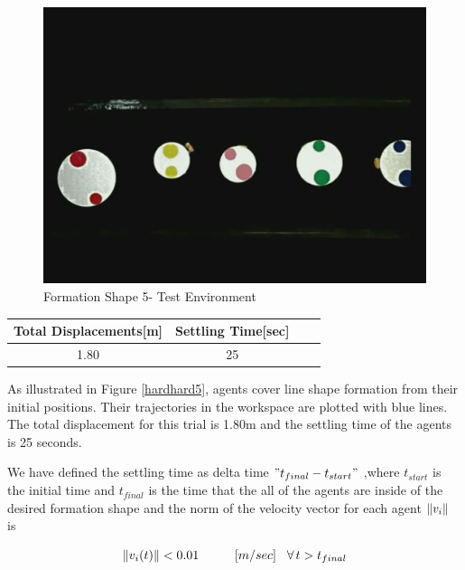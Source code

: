 \begin{figure}[H]
\caption{Formation Shape 5- Test Environment}
\centerline{\includegraphics[scale = 0.35]{9_real_hardware}}
\end{figure} 
					
\begin{center}
 \label{hardwareshape5_ref} 
\begin{tabular}{||c| c |c |c ||}
\hline
Total Displacements[m]  & Settling Time[sec]\\ 
\hline
1.80 & 25 \\
\hline
\end{tabular}
\end{center}

As illustrated in Figure \ref{hardhard5}, agents cover line shape formation from their initial positions. Their trajectories in the workspace are plotted with blue lines. The total displacement for this trial is 1.80m and the settling time of the agents is 25 seconds.	

We have defined the settling time as delta time $"t_{final} - t_{start}"$ ,where $t_{start}$ is the initial time and $t_{final}$ is the time that the all of the agents are inside of the desired formation shape and the norm of the velocity vector for each agent $\left\lVert v_i\right\rVert$ is

\begin{equation}
\left\lVert v_i(t)\right\rVert < 0.01 \hspace{1.0cm} [m/sec] \hspace{0.3cm}\forall\hspace{0.05cm} t>t_{final}
\end{equation}

